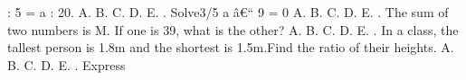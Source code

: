 \documentclass{article}
\begin{document}
\begin{multicols}{2}
 : 5 = a : 20. \newline \indent A. \newline \indent B. \newline \indent C. \newline \indent D. \newline \indent E.  \newline{}. Solve3/5 a â€“ 9 = 0 \newline \indent A. \newline \indent B. \newline \indent C. \newline \indent D. \newline \indent E.  \newline{}. The sum of two numbers is M. If one is 39, what is the other? \newline \indent A. \newline \indent B. \newline \indent C. \newline \indent D. \newline \indent E.  \newline{}. In a class, the tallest person is 1.8m and the shortest is 1.5m.Find the ratio of their heights. \newline \indent A. \newline \indent B. \newline \indent C. \newline \indent D. \newline \indent E.  \newline{}. Express 
\end{multicols}
\end{document}

